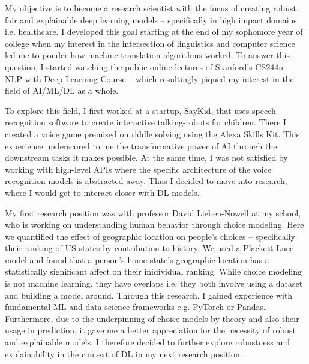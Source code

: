 \documentclass[12pt]{article}
\begin{document}

My objective is to become a research scientist with the focus of creating robust, fair and explainable deep learning models -- specifically in high impact domains i.e. healthcare. %
I developed this goal starting at the end of my sophomore year of college when my interest in the intersection of linguistics and computer science led me to ponder how machine translation algorithms worked. To answer this question, I started watching the public online lectures of Stanford's CS244n -- NLP with Deep Learning Course --  which resultingly piqued my interest in the field of AI/ML/DL as a whole. 

To explore this field, I first worked at a startup, SayKid, that uses speech recognition software to create interactive talking-robots for children. There I created a voice game premised on riddle solving using the Alexa Skills Kit. This experience underscored to me the transformative power of AI through the downstream tasks it makes possible. At the same time, I was not satisfied by working with high-level APIs where the specific architecture of the voice recognition models is abstracted away. Thus I decided to move into research, where I would get to interact closer with DL models.

My first research position was with professor David Lieben-Nowell at my school, who is working on understanding human behavior through choice modeling. Here we quantified the effect of geographic location on people's choices -- specifically their ranking of US states by contribution to history. We used a Plackett-Luce model and found that a person's home state's geographic location has a statistically significant affect on their inidividual ranking.
While choice modeling is not machine learning, they have overlaps i.e. they both involve using a dataset and building a model around. Through this research, I gained experience with fundamental ML and data science frameworks e.g. PyTorch or Pandas. 
Furthermore, due to the underpinning of choice models by theory and also their usage in prediction, it gave me a better appreciation for the necessity of robust and explainable models. I therefore decided to further explore robustness and explainability in the context of DL in my next research position.
\end{document}
